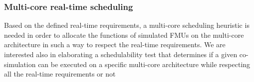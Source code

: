 \subsubsection{Multi-core real-time scheduling}

Based on the defined real-time requirements, a multi-core scheduling heuristic is needed in order to allocate the functions of simulated FMUs on the multi-core architecture in such a way to respect the real-time requirements. We are interested also in elaborating a schedulability test that determines if a given co-simulation can be executed on a specific multi-core architecture while respecting all the real-time requirements or not  